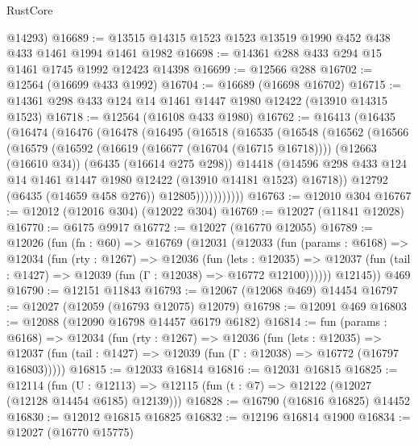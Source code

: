 \begin{lexlean}{RustCore}
\begin{coremodule}
      @14293)
@16689 := @13515 @14315 @1523 @1523 @13519 @1990 @452 @438 @433 @1461 @1994 @1461 @1982
@16698 := @14361 @288 @433 @294 @15 @1461 @1745 @1992 @12423 @14398
@16699 := @12566 @288
@16702 := @12564 (@16699 @433 @1992)
@16704 := @16689 (@16698 @16702)
@16715 := @14361 @298 @433 @124 @14 @1461 @1447 @1980 @12422 (@13910 @14315 @1523)
@16718 := @12564 (@16108 @433 @1980)
@16762 := @16413
    (@16435
      (@16474
        (@16476
          (@16478
            (@16495
              (@16518
                (@16535
                  (@16548
                    (@16562
                      (@16566
                        (@16579
                          (@16592
                            (@16619 (@16677 (@16704 (@16715 @16718))))
                            (@12663 (@16610 @34))
                            (@6435 (@16614 @275 @298))
                            @14418
                            (@14596
                              @298
                              @433
                              @124
                              @14
                              @1461
                              @1447
                              @1980
                              @12422
                              (@13910 @14181 @1523)
                              @16718))
                          @12792
                          (@6435 (@14659 @458 @276))
                          @12805)))))))))))
@16763 := @12010 @304
@16767 := @12012 (@12016 @304) (@12022 @304)
@16769 := @12027 (@11841 @12028)
@16770 := @6175 @9917
@16772 := @12027 (@16770 @12055)
@16789 := @12026
    (fun (fn : @60) =>
    @16769
      (@12031
        (@12033
          (fun (params : @6168) =>
          @12034
            (fun (rty : @1267) =>
            @12036
              (fun (lets : @12035) =>
              @12037 (fun (tail : @1427) => @12039 (fun (Γ : @12038) => @16772 @12100))))))
        @12145))
    @469
@16790 := @12151 @11843
@16793 := @12067 (@12068 @469) @14454
@16797 := @12027 (@12059 (@16793 @12075) @12079)
@16798 := @12091 @469
@16803 := @12088 (@12090 @16798 @14457 @6179 @6182)
@16814 := fun (params : @6168) =>
  @12034
    (fun (rty : @1267) =>
    @12036
      (fun (lets : @12035) =>
      @12037 (fun (tail : @1427) => @12039 (fun (Γ : @12038) => @16772 (@16797 @16803)))))
@16815 := @12033 @16814
@16816 := @12031 @16815
@16825 := @12114
    (fun (U : @12113) => @12115 (fun (t : @7) => @12122 (@12027 (@12128 @14454 @6185) @12139)))
@16828 := @16790 (@16816 @16825) @14452
@16830 := @12012 @16815 @16825
@16832 := @12196 @16814 @1900
@16834 := @12027 (@16770 @15775)

\end{coremodule}
\end{lexlean}
